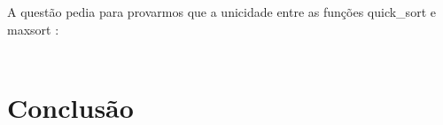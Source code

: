 \documentclass{article}
\begin{document}
A questão pedia para provarmos que a unicidade entre as funções quick\_sort e maxsort :\\
\\

\section{Conclusão}




\end{document}
